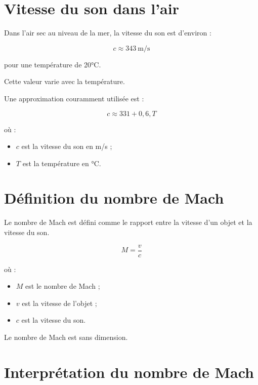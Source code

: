 \section{Vitesse du son dans l'air}

Dans l'air sec au niveau de la mer, la vitesse du son est d'environ :

\begin{equation}
c \approx 343~\mathrm{m/s}
\end{equation}

pour une température de 20°C.

Cette valeur varie avec la température.

\begin{rigueur}

Une approximation couramment utilisée est :

\begin{equation}
c \approx 331 + 0,6,T
\label{eq:vitesse_son}
\end{equation}

où :

\begin{itemize}
\item $c$ est la vitesse du son en m/s ;
\item $T$ est la température en °C.
\end{itemize}

\end{rigueur}

\section{Définition du nombre de Mach}

Le nombre de Mach est défini comme le rapport entre la vitesse d'un objet et
la vitesse du son.

\begin{equation}
M = \frac{v}{c}
\label{eq:mach}
\end{equation}

où :

\begin{itemize}
\item $M$ est le nombre de Mach ;
\item $v$ est la vitesse de l'objet ;
\item $c$ est la vitesse du son.
\end{itemize}

Le nombre de Mach est sans dimension.

\section{Interprétation du nombre de Mach}

